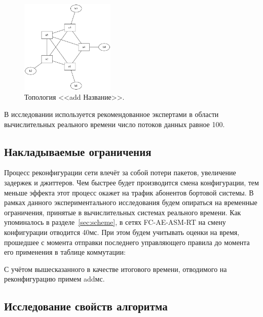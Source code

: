 \documentclass[12pt, a4paper]{article}
\begin{document}
\begin{figure}[h!]
	\centering
	\includegraphics[width=0.40\textwidth]{img/5node.png}
	\caption{Топология <<add Название>>.}
	\label{pic:5node}
\end{figure}

В исследовании используется рекомендованное экспертами в области вычислительных реального времени число потоков данных равное 100.

\subsection{Накладываемые ограничения} \label{subsec:limits}
Процесс реконфигурации сети влечёт за собой потери пакетов, увеличение задержек и джиттеров. Чем быстрее будет производится смена конфигурации, тем меньше эффекта этот процесс окажет на трафик абонентов бортовой системы. В рамках данного экспериментального исследования будем опираться на временные ограничения, принятые в вычислительных системах реального времени. Как упоминалось в разделе~\ref{sec:scheme}, в сетях FC-AE-ASM-RT на смену конфигурации отводится 40мс. При этом будем учитывать оценки на время, прошедшее с момента отправки последнего управляющего правила до момента его применения в таблице коммутации:

С учётом вышесказанного в качестве итогового времени, отводимого на реконфигурацию примем addмс.
\subsection{Исследование свойств алгоритма}
\end{document}
